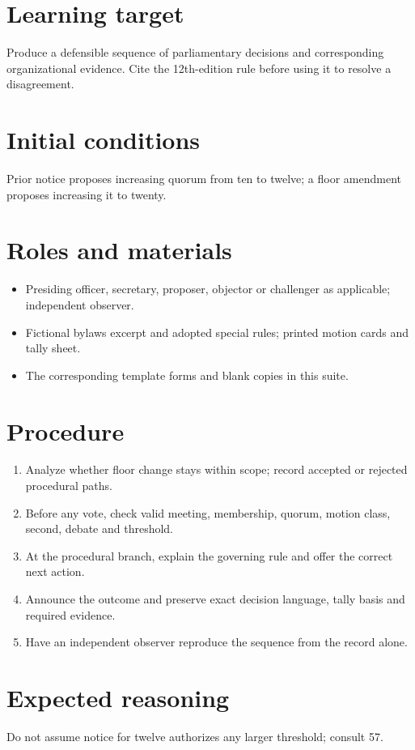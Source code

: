 \documentclass[11pt]{article}
\begin{document}
\SuiteOpen
\section{Learning target}
Produce a defensible sequence of parliamentary decisions and corresponding organizational evidence. Cite the 12th-edition rule before using it to resolve a disagreement.

\section{Initial conditions}
Prior notice proposes increasing quorum from ten to twelve; a floor amendment proposes increasing it to twenty.

\section{Roles and materials}
\begin{itemize}[leftmargin=*,itemsep=4pt]
\item Presiding officer, secretary, proposer, objector or challenger as applicable; independent observer.
\item Fictional bylaws excerpt and adopted special rules; printed motion cards and tally sheet.
\item The corresponding template forms and blank copies in this suite.
\end{itemize}

\section{Procedure}
\begin{enumerate}[leftmargin=*,itemsep=4pt]
\item Analyze whether floor change stays within scope; record accepted or rejected procedural paths.
\item Before any vote, check valid meeting, membership, quorum, motion class, second, debate and threshold.
\item At the procedural branch, explain the governing rule and offer the correct next action.
\item Announce the outcome and preserve exact decision language, tally basis and required evidence.
\item Have an independent observer reproduce the sequence from the record alone.
\end{enumerate}

\section{Expected reasoning}
Do not assume notice for twelve authorizes any larger threshold; consult 57.
\end{document}
